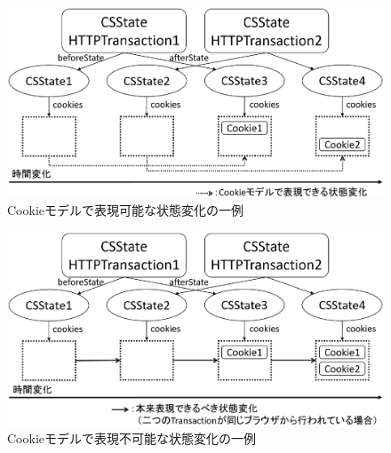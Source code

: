 \documentclass[12pt,a4paper]{jbook}
\begin{document}
\begin{figure}[htb]
\centering
\includegraphics[width=450pt]{./fig/2transaction-a.eps}
\caption{Cookieモデルで表現可能な状態変化の一例}
\label{fig:2transaction-a}
\end{figure}

\begin{figure}[hbt]
\centering
\includegraphics[width=450pt]{./fig/2transaction-b.eps}
\caption{Cookieモデルで表現不可能な状態変化の一例}
\label{fig:2transaction-b}
\end{figure}
\end{document}
